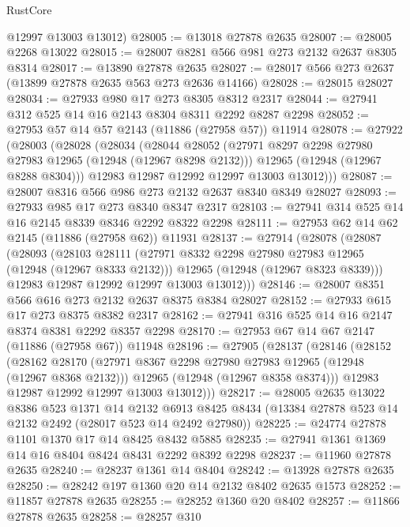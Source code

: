 \begin{lexlean}{RustCore}
\begin{coremodule}
      @12997
      @13003
      @13012)
@28005 := @13018 @27878 @2635
@28007 := @28005 @2268 @13022
@28015 := @28007 @8281 @566 @981 @273 @2132 @2637 @8305 @8314
@28017 := @13890 @27878 @2635
@28027 := @28017 @566 @273 @2637 (@13899 @27878 @2635 @563 @273 @2636 @14166)
@28028 := @28015 @28027
@28034 := @27933 @980 @17 @273 @8305 @8312 @2317
@28044 := @27941 @312 @525 @14 @16 @2143 @8304 @8311 @2292 @8287 @2298
@28052 := @27953 @57 @14 @57 @2143 (@11886 (@27958 @57)) @11914
@28078 := @27922
    (@28003
      (@28028
        (@28034
          (@28044
            @28052
            (@27971 @8297 @2298 @27980 @27983 @12965 (@12948 (@12967 @8298 @2132)))
            @12965
            (@12948 (@12967 @8288 @8304)))
          @12983
          @12987
          @12992
          @12997
          @13003
          @13012)))
@28087 := @28007 @8316 @566 @986 @273 @2132 @2637 @8340 @8349 @28027
@28093 := @27933 @985 @17 @273 @8340 @8347 @2317
@28103 := @27941 @314 @525 @14 @16 @2145 @8339 @8346 @2292 @8322 @2298
@28111 := @27953 @62 @14 @62 @2145 (@11886 (@27958 @62)) @11931
@28137 := @27914
    (@28078
      (@28087
        (@28093
          (@28103
            @28111
            (@27971 @8332 @2298 @27980 @27983 @12965 (@12948 (@12967 @8333 @2132)))
            @12965
            (@12948 (@12967 @8323 @8339)))
          @12983
          @12987
          @12992
          @12997
          @13003
          @13012)))
@28146 := @28007 @8351 @566 @616 @273 @2132 @2637 @8375 @8384 @28027
@28152 := @27933 @615 @17 @273 @8375 @8382 @2317
@28162 := @27941 @316 @525 @14 @16 @2147 @8374 @8381 @2292 @8357 @2298
@28170 := @27953 @67 @14 @67 @2147 (@11886 (@27958 @67)) @11948
@28196 := @27905
    (@28137
      (@28146
        (@28152
          (@28162
            @28170
            (@27971 @8367 @2298 @27980 @27983 @12965 (@12948 (@12967 @8368 @2132)))
            @12965
            (@12948 (@12967 @8358 @8374)))
          @12983
          @12987
          @12992
          @12997
          @13003
          @13012)))
@28217 := @28005
    @2635
    @13022
    @8386
    @523
    @1371
    @14
    @2132
    @6913
    @8425
    @8434
    (@13384 @27878 @523 @14 @2132 @2492 (@28017 @523 @14 @2492 @27980))
@28225 := @24774 @27878 @1101 @1370 @17 @14 @8425 @8432 @5885
@28235 := @27941 @1361 @1369 @14 @16 @8404 @8424 @8431 @2292 @8392 @2298
@28237 := @11960 @27878 @2635
@28240 := @28237 @1361 @14 @8404
@28242 := @13928 @27878 @2635
@28250 := @28242 @197 @1360 @20 @14 @2132 @8402 @2635 @1573
@28252 := @11857 @27878 @2635
@28255 := @28252 @1360 @20 @8402
@28257 := @11866 @27878 @2635
@28258 := @28257 @310

\end{coremodule}
\end{lexlean}
